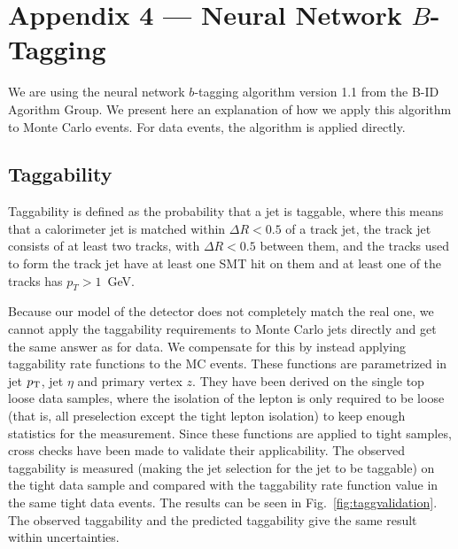 %
\appendix
\section*{Appendix 4 --- Neural Network $B$-Tagging}
\label{appendix-nn-btagging}

We are using the neural network $b$-tagging algorithm version 1.1 from
the B-ID Agorithm Group. We present here an explanation of how we
apply this algorithm to Monte Carlo events. For data events, the
algorithm is applied directly.

\subsection{Taggability}
\label{taggability}

Taggability is defined as the probability that a jet is taggable,
where this means that a calorimeter jet is matched within $\Delta R <
0.5$ of a track jet, the track jet consists of at least two tracks,
with $\Delta R < 0.5$ between them, and the tracks used to form the
track jet have at least one SMT hit on them and at least one of the
tracks has $p_T > 1$~GeV.

Because our model of the detector does not completely match the real
one, we cannot apply the taggability requirements to Monte Carlo jets
directly and get the same answer as for data. We compensate for this
by instead applying taggability rate functions to the MC events.
These functions are parametrized in jet $\mbox{$p_{\rm T}$}$, jet $\eta$ and primary
vertex $z$. They have been derived on the single top loose data
samples, where the isolation of the lepton is only required to be
loose (that is, all preselection except the tight lepton isolation) to
keep enough statistics for the measurement. Since these functions are
applied to tight samples, cross checks have been made to validate
their applicability. The observed taggability is measured (making the
jet selection for the jet to be taggable) on the tight data sample and
compared with the taggability rate function value in the same tight
data events. The results can be seen in
Fig.~\ref{fig:taggvalidation}. The observed taggability and the
predicted taggability give the same result within uncertainties.

